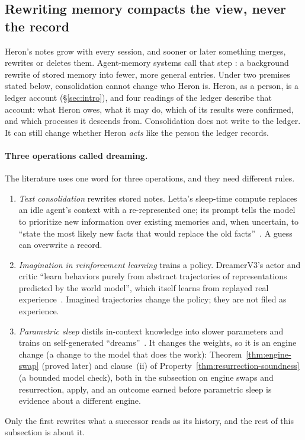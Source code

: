 \subsection{Rewriting memory compacts the view, never the record}\label{sec:stp-consolidation}

Heron's notes grow with every session, and sooner or later something merges,
rewrites or deletes them. Agent-memory systems call that step
: a background rewrite of stored memory into fewer, more
general entries. Under two premises stated below, consolidation cannot change
who Heron is. Heron, as a person, is a ledger account (\S\ref{sec:intro}), and
four readings of the ledger describe that account: what Heron owes, what it may
do, which of its results were confirmed, and which processes it descends from.
Consolidation does not write to the ledger. It can still change whether Heron
\emph{acts} like the person the ledger records.

\paragraph{Three operations called dreaming.} The literature uses one word for
three operations, and they need different rules.
\begin{enumerate}[leftmargin=1.6em,itemsep=1pt]
\item \emph{Text consolidation} rewrites stored notes. Letta's sleep-time
compute replaces an idle agent's context with a re-represented one; its prompt
tells the model to prioritize new information over existing memories and, when
uncertain, to ``state the most likely new facts that would replace the old
facts''~. A guess can overwrite a record.
\item \emph{Imagination in reinforcement learning} trains a policy. DreamerV3's
actor and critic ``learn behaviors purely from abstract trajectories of
representations predicted by the world model'', which itself learns from
replayed real experience~. Imagined trajectories
change the policy; they are not filed as experience.
\item \emph{Parametric sleep} distils in-context knowledge into slower
parameters and trains on self-generated ``dreams''~.
It changes the weights, so it is an engine change (a change to the model that
does the work): Theorem~\ref{thm:engine-swap} (proved later) and clause~(ii) of
Property~\ref{thm:resurrection-soundness} (a bounded model check), both in
the subsection on engine swaps and resurrection, apply, and an outcome earned before parametric
sleep is evidence about a different engine.
\end{enumerate}
Only the first rewrites what a successor reads as its history, and the rest of
this subsection is about it.

